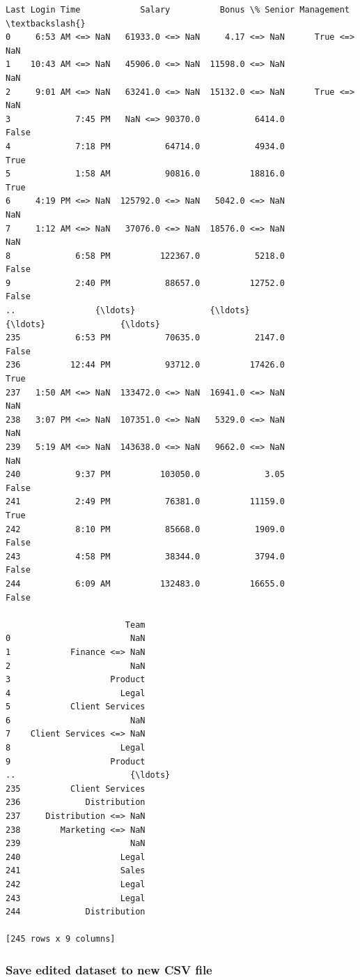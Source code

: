 \documentclass [oneside,10pt,a4paper,ngerman,BCOR10mm,headsepline,parindent,final]{scrartcl}
\begin{document}
\begin{tcolorbox}[breakable, size=fbox, boxrule=.5pt, pad at break*=1mm, opacityfill=0]
\begin{Verbatim}[commandchars=\\\{\}]
      Last Login Time            Salary          Bonus \% Senior Management  \textbackslash{}
0     6:53 AM <=> NaN   61933.0 <=> NaN     4.17 <=> NaN      True <=> NaN
1    10:43 AM <=> NaN   45906.0 <=> NaN  11598.0 <=> NaN               NaN
2     9:01 AM <=> NaN   63241.0 <=> NaN  15132.0 <=> NaN      True <=> NaN
3             7:45 PM   NaN <=> 90370.0           6414.0             False
4             7:18 PM           64714.0           4934.0              True
5             1:58 AM           90816.0          18816.0              True
6     4:19 PM <=> NaN  125792.0 <=> NaN   5042.0 <=> NaN               NaN
7     1:12 AM <=> NaN   37076.0 <=> NaN  18576.0 <=> NaN               NaN
8             6:58 PM          122367.0           5218.0             False
9             2:40 PM           88657.0          12752.0             False
..                {\ldots}               {\ldots}              {\ldots}               {\ldots}
235           6:53 PM           70635.0           2147.0             False
236          12:44 PM           93712.0          17426.0              True
237   1:50 AM <=> NaN  133472.0 <=> NaN  16941.0 <=> NaN               NaN
238   3:07 PM <=> NaN  107351.0 <=> NaN   5329.0 <=> NaN               NaN
239   5:19 AM <=> NaN  143638.0 <=> NaN   9662.0 <=> NaN               NaN
240           9:37 PM          103050.0             3.05             False
241           2:49 PM           76381.0          11159.0              True
242           8:10 PM           85668.0           1909.0             False
243           4:58 PM           38344.0           3794.0             False
244           6:09 AM          132483.0          16655.0             False

                        Team
0                        NaN
1            Finance <=> NaN
2                        NaN
3                    Product
4                      Legal
5            Client Services
6                        NaN
7    Client Services <=> NaN
8                      Legal
9                    Product
..                       {\ldots}
235          Client Services
236             Distribution
237     Distribution <=> NaN
238        Marketing <=> NaN
239                      NaN
240                    Legal
241                    Sales
242                    Legal
243                    Legal
244             Distribution

[245 rows x 9 columns]
\end{Verbatim}
\end{tcolorbox}
        
    \hypertarget{save-edited-dataset-to-new-csv-file}{%
\subsubsection{Save edited dataset to new CSV
file}\label{save-edited-dataset-to-new-csv-file}}
\end{document}
